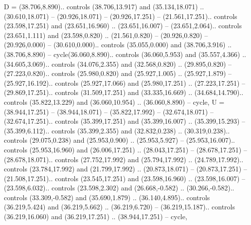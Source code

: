 {D} = {(38.706,8.890).. controls (38.706,13.917) and (35.134,18.071) .. (30.610,18.071) -- (20.926,18.071) -- (20.926,17.251) -- (21.561,17.251).. controls (23.598,17.251) and (23.651,16.960) .. (23.651,16.007) -- (23.651,2.064).. controls (23.651,1.111) and (23.598,0.820) .. (21.561,0.820) -- (20.926,0.820) -- (20.926,0.000) -- (30.610,0.000).. controls (35.055,0.000) and (38.706,3.916) .. (38.706,8.890) -- cycle(36.060,8.890).. controls (36.060,5.953) and (35.557,4.366) .. (34.605,3.069).. controls (34.076,2.355) and (32.568,0.820) .. (29.895,0.820) -- (27.223,0.820).. controls (25.980,0.820) and (25.927,1.005) .. (25.927,1.879) -- (25.927,16.192).. controls (25.927,17.066) and (25.980,17.251) .. (27.223,17.251) -- (29.869,17.251).. controls (31.509,17.251) and (33.335,16.669) .. (34.684,14.790).. controls (35.822,13.229) and (36.060,10.954) .. (36.060,8.890) -- cycle},
{U} = {(38.944,17.251) -- (38.944,18.071) -- (35.822,17.992) -- (32.674,18.071) -- (32.674,17.251).. controls (35.399,17.251) and (35.399,16.007) .. (35.399,15.293) -- (35.399,6.112).. controls (35.399,2.355) and (32.832,0.238) .. (30.319,0.238).. controls (29.075,0.238) and (25.953,0.900) .. (25.953,5.927) -- (25.953,16.007).. controls (25.953,16.960) and (26.006,17.251) .. (28.043,17.251) -- (28.678,17.251) -- (28.678,18.071).. controls (27.752,17.992) and (25.794,17.992) .. (24.789,17.992).. controls (23.784,17.992) and (21.799,17.992) .. (20.873,18.071) -- (20.873,17.251) -- (21.508,17.251).. controls (23.545,17.251) and (23.598,16.960) .. (23.598,16.007) -- (23.598,6.032).. controls (23.598,2.302) and (26.668,-0.582) .. (30.266,-0.582).. controls (33.309,-0.582) and (35.690,1.879) .. (36.140,4.895).. controls (36.219,5.424) and (36.219,5.662) .. (36.219,6.720) -- (36.219,15.187).. controls (36.219,16.060) and (36.219,17.251) .. (38.944,17.251) -- cycle},
